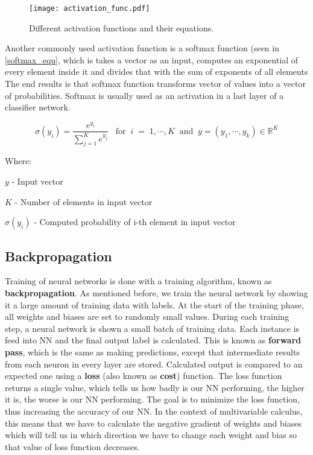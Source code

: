 \begin{figure}[ht!]
        \centering
        \texttt{[image: activation\_func.pdf]} 
        \caption{Different activation functions and their equations.}
        \label{activation_functions}
\end{figure}


Another commonly used activation function is a softmax function (seen in \ref{softmax_equ}, which is takes a vector as an input, computes an exponential of every element inside it and divides that with the sum of exponents of all elements\cite{geron}
The end results is that softmax function transforms vector of values into a vector of probabilities.
Softmax is usually used as an activation in a last layer of a classifier network. 

\begin{equation}\label{softmax_equ}
    \sigma(y_i) = \frac{e^{y_i}}{\sum_{j=1}^{K}e^{y_j}}\;\;\;\text{for}\;\;i\;=\;1,\cdots,K\;\;\text{and}\;\;y=(y_1,\cdots,y_k)\in\mathbb{R}^K
\end{equation}

Where:

$y$ - Input vector

$K$ - Number of elements in input vector

$\sigma(y_i)$ - Computed probability of i-th element in input vector 


\subsection{ Backpropagation}

Training of neural networks is done with a training algorithm, known as \textbf{backpropagation}.
As mentioned before, we train the neural network by showing it a large amount of training data with labels.
At the start of the training phase, all weights and biases are set to randomly small values.
During each training step, a neural network is shown a small batch of training data. 
Each instance is feed into NN and the final output label is calculated.
This is known as \textbf{forward pass}, which is the same as making predictions, except that intermediate results from each neuron in every layer are stored.
Calculated output is compared to an expected one using a \textbf{loss} (also known as \textbf{cost}) function.
The loss function returns a single value, which tells us how badly is our NN performing, the higher it is, the worse is our NN performing.
The goal is to minimize the loss function, thus increasing the accuracy of our NN.
In the context of multivariable calculus, this means that we have to calculate the negative gradient of weights and biases which will tell us in which direction we have to change each weight and bias so that value of loss function decreases. 

